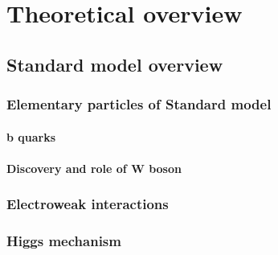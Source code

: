 
\chapter{Theoretical overview} %

\label{Chapter2} %



\section{Standard model overview}



\subsection{Elementary particles of Standard model}

\subsubsection{b quarks}

\subsubsection{Discovery and role of W boson}


\subsection{Electroweak interactions}




\subsection{Higgs mechanism}


